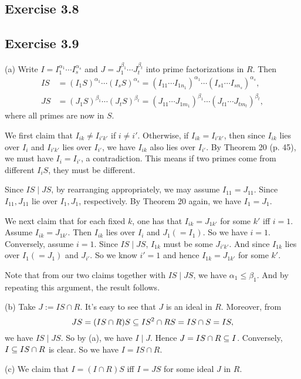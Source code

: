 \documentclass[../Marcus.tex]{subfiles}
\begin{document}
\subsection*{Exercise 3.8}

\subsection*{Exercise 3.9}

(a) Write $I=I_1^{\alpha_1}\cdots I_s^{\alpha_s}$ and $J=J_1^{\beta_1}\cdots J_t^{\beta_t}$ into prime factorizations in $R$. Then
\begin{align*}
    IS &= (I_1S)^{\alpha_1}\cdots (I_sS)^{\alpha_s}=(I_{11}\cdots I_{1n_1})^{\alpha_1}\cdots (I_{s1}\cdots I_{sn_s})^{\alpha_s}, \\
    JS &= (J_1S)^{\beta_1}\cdots (J_tS)^{\beta_t}=(J_{11}\cdots J_{1m_1})^{\beta_1}\cdots (J_{t1}\cdots J_{tm_t})^{\beta_t},
\end{align*}
where all primes are now in $S$.

We first claim that $I_{ik}\neq I_{i'k'}$ if $i\neq i'$. Otherwise, if $I_{ik}=I_{i'k'}$, then since $I_{ik}$ lies over $I_i$ and $I_{i'k'}$ lies over $I_{i'}$, we have $I_{ik}$ also lies over $I_{i'}$. By Theorem 20 (p. 45), we must have $I_i=I_{i'}$, a contradiction. This means if two primes come from different $I_iS$, they must be different.

Since $IS\mid JS$, by rearranging appropriately, we may assume $I_{11}=J_{11}$. Since $I_{11},J_{11}$ lie over $I_1,J_1$, respectively. By Theorem 20 again, we have $I_1=J_1$.

We next claim that for each fixed $k$, one has that $I_{ik}=J_{1k'}$ for some $k'$ iff $i=1$. Assume $I_{ik}=J_{1k'}$. Then $I_{ik}$ lies over $I_i$ and $J_1(=I_1)$. So we have $i=1$. Conversely, assume $i=1$. Since $IS\mid JS$, $I_{1k}$ must be some $J_{i'k'}$. And since $I_{1k}$ lies over $I_1(=J_1)$ and $J_{i'}$. So we know $i'=1$ and hence $I_{1k}=J_{1k'}$ for some $k'$.

Note that from our two claims together with $IS\mid JS$, we have $\alpha_1\leq \beta_1$. And by repeating this argument, the result follows.

(b) Take $J:=IS\cap R$. It's easy to see that $J$ is an ideal in $R$. Moreover, from 
$$
JS = (IS\cap R)S \subseteq IS^2\cap RS = IS\cap S = IS,
$$
we have $IS\mid JS$. So by (a), we have $I\mid J$. Hence $J=IS\cap R\subseteq I$. Conversely, $I\subseteq IS\cap R$ is clear. So we have $I=IS\cap R$.

(c) We claim that $I=(I\cap R)S$ iff $I=JS$ for some ideal $J$ in $R$.
\end{document}
